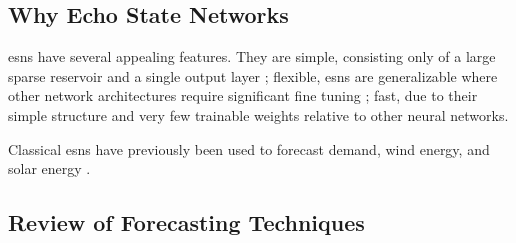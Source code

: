 \subsection{Why Echo State Networks}
\glspl{esn} have several appealing features. They are simple, consisting only
of a large sparse reservoir and a single output layer
\cite{lukosevicius_practical_2012}; flexible, \glspl{esn} are generalizable
where other network architectures require significant fine tuning
\cite{noauthor_deterministic_2019}; fast, due to their simple structure and very few trainable weights relative to other neural networks.

Classical \glspl{esn} have previously been used to forecast demand, wind energy, and solar energy \cite{deihimi_application_2012,}.
\subsection{Review of Forecasting Techniques}
